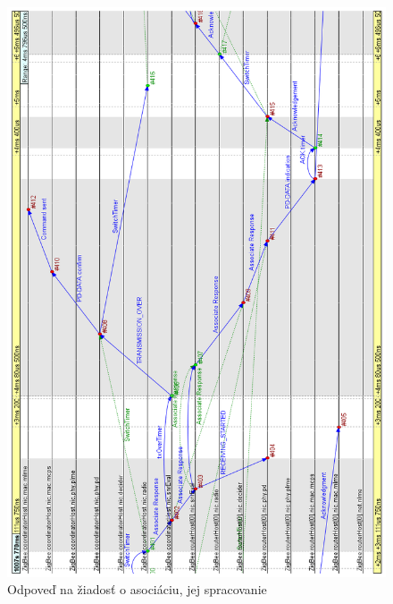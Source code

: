 \begin{figure}[htbp]
\begin{center}
\includegraphics[width=140mm]{figures/chart_associate_response}
\caption{Odpoveď na žiadosť o asociáciu, jej spracovanie}
\label{fig:chart_associate_response}
\end{center}
\end{figure}